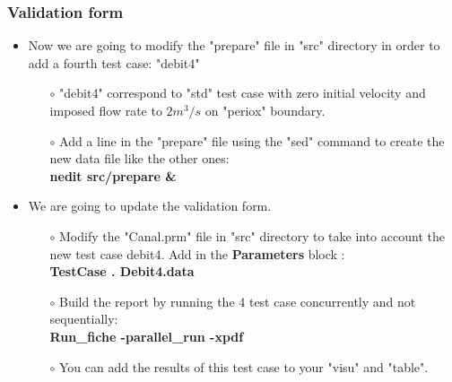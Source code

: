 \documentclass[10pt, hyperref={unicode=true,pdfusetitle, bookmarks=true,bookmarksnumbered=false,bookmarksopen=false, breaklinks=false,pdfborder={0 0 1},backref=true,colorlinks=true,linkcolor=darkblue,pageanchor}]{beamer}
\begin{document}
\begin{frame}
\frametitle{Validation form}
\begin{block}{}

\begin{itemize}
\item Now we are going to modify the "prepare" file in "src" directory in order to add a fourth test case: "debit4"
    \begin{itemize}
    \item [$\circ$] "debit4" correspond to "std" test case with zero initial velocity and imposed flow rate to $2 m^3/s$ on "periox" boundary.
    \item [$\circ$] Add a line in the "prepare" file using the "sed" command to create the new data file like the other ones:\\
    \textbf{nedit src/prepare \& }
    \end{itemize}

\item We are going to update the validation form.
    \begin{itemize}
    \item [$\circ$] Modify the "Canal.prm" file in "src" directory to take into account the new test case debit4. Add in the \textbf{Parameters} block :\\
    \hspace{0.3cm} \textbf{TestCase . Debit4.data}\\

    \item [$\circ$] Build the report by running the 4 test case concurrently and not sequentially:\\
    \textbf{Run\_fiche -parallel\_run -xpdf}
    \item [$\circ$] You can add the results of this test case to your "visu" and "table".
    \end{itemize}

\end{itemize}

\end{block}
\end{frame}
\end{document}
